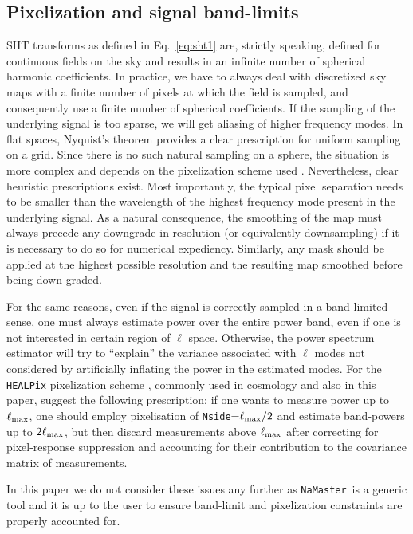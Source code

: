 \documentclass[usenatbib]{mnrasb}
\newcommand{\nmt}{{\tt NaMaster}}
\begin{document}
      \subsection{Pixelization and signal band-limits}\label{app:shts.blim}
        SHT transforms as defined in Eq.~\ref{eq:sht1} are, strictly speaking, defined for continuous fields on the sky and results in an infinite number of spherical harmonic coefficients. In practice, we have to always deal with discretized sky maps with a finite number of pixels at which the field is sampled, and consequently use a finite number of spherical coefficients. If the sampling of the underlying signal is too sparse, we will get aliasing of higher frequency modes. In flat spaces, Nyquist's theorem provides a clear prescription for uniform sampling on a grid. Since there is no such natural sampling on a sphere, the situation is more complex and depends on the pixelization scheme used \citep{Driscoll:1994:CFT:184069.184073,DBLP:journals/corr/abs-1110-6297}. Nevertheless, clear heuristic prescriptions exist. Most importantly, the typical pixel separation needs to be smaller than the wavelength of the highest frequency mode present in the underlying signal. As a natural consequence, the smoothing of the map must always precede any downgrade in resolution (or equivalently downsampling) if it is necessary to do so for numerical expediency. Similarly, any mask should be applied at the highest possible resolution and the resulting map smoothed before being down-graded.

        For the same reasons, even if the signal is correctly sampled in a band-limited sense, one must always estimate power over the entire power band, even if one is not interested in certain region of $\ell$ space. Otherwise, the power spectrum estimator will try to ``explain'' the variance associated with $\ell$ modes not considered by artificially inflating the power in the estimated modes. For the {\tt HEALPix} pixelization scheme \citep{2005ApJ...622..759G}, commonly used in cosmology and also in this paper, \cite{2013MNRAS.435.1857L} suggest the following prescription: if one wants to measure power up to $\ell_{\rm max}$, one should employ pixelisation of \texttt{Nside}=$\ell_{\rm max}/2$ and estimate band-powers up to $2 \ell_{\rm max}$, but then discard measurements above $\ell_{\rm max}$ after correcting for pixel-response suppression and accounting for their contribution to the covariance matrix of measurements.

        In this paper we do not consider these issues any further as \nmt~is a generic tool and it is up to the user to ensure band-limit and pixelization constraints are properly accounted for.
      
\end{document}
